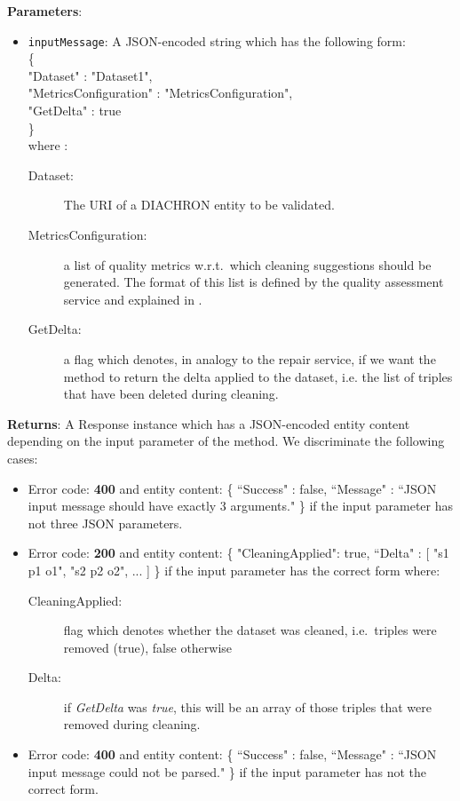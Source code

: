 \begin{description}
\textbf{Parameters}: 
\begin{itemize}
\item \texttt{inputMessage}: A JSON-encoded string which has the following form: \\
\{ \\
\hspace*{0.5 cm}"Dataset" : "Dataset1", \\
\hspace*{0.5 cm}"MetricsConfiguration" : "MetricsConfiguration", \\ 
\hspace*{0.5 cm}"GetDelta" : true \\
\} \\
where : 
\begin{description}
\item[Dataset:] The URI of a DIACHRON entity to be validated. 
\item[MetricsConfiguration:] a list of quality metrics w.r.t.\ which cleaning suggestions should be generated.  The format of this list is defined by the quality assessment service and explained in \cite[section~2.4]{diachron-d5.2}. 
\item[GetDelta:] a flag which denotes, in analogy to the repair service, if we want the method to return the delta applied to the dataset, i.e. the list of triples that have been deleted during cleaning.
\end{description}

\end{itemize}
\textbf{Returns}: A Response instance which has a JSON-encoded entity content depending on the input parameter of the method. We discriminate the following cases: 
\begin{itemize}
\item Error code: \textbf{400} and entity content: \{ ``Success" : false, ``Message" : ``JSON input message should have exactly 3 arguments." \} if the input parameter has not three JSON parameters. 
\item Error code: \textbf{200} and entity content: 
\{ "CleaningApplied": true, ``Delta" : [ "s1 p1 o1", "s2 p2 o2", ... ] \} 
if the input parameter has the correct form where:
\begin{description}
\item [CleaningApplied:] flag which denotes whether the dataset was cleaned, i.e.\ triples were removed (true), false otherwise
\item [Delta:] if \textit{GetDelta} was \textit{true}, this will be an array of those triples that were removed during cleaning.
\end{description} 
\item Error code: \textbf{400} and entity content: \{ ``Success" : false, ``Message" : ``JSON input message could not be parsed." \} if the input parameter has not the correct form. 
\end{itemize}


\end{description}


